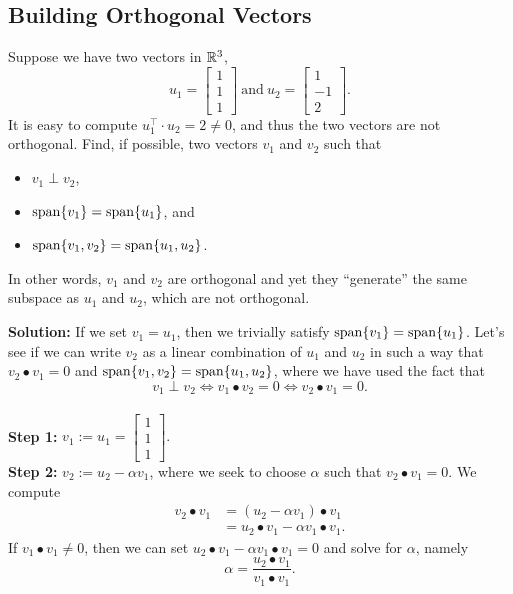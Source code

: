 \subsection{Building Orthogonal Vectors}
\begin{example}
\label{ex:Orthogonalize} Suppose we have two vectors in $\mathbb R^3$,
$$u_1 = \left[\begin{array}{c}  1 \\ 1 \\1\end{array} \right]~\text{and}~u_2 = \left[\begin{array}{r}  1 \\ -1 \\2\end{array} \right].$$
It is easy to compute $u_1^\top \cdot u_2 = 2 \neq 0$, and thus the two vectors are not orthogonal. Find, if possible, two vectors $v_1$ and $v_2$ such that 
\begin{itemize}
    \item $v_1 \perp v_2$, 
    \item $\mathrm{span} \{ v_1 \} = \mathrm{span} \{ u_1 \}$, and
    \item $\mathrm{span} \{ v_1, v_2 \} = \mathrm{span} \{ u_1, u_2 \}$.
\end{itemize}  
In other words, $v_1$ and $v_2$ are orthogonal and yet they ``generate'' the same subspace as $u_1$ and $u_2$, which are not orthogonal. 
 \end{example}

\textbf{Solution:} If we set $v_1 = u_1$, then we trivially satisfy $\mathrm{span} \{ v_1 \} = \mathrm{span} \{ u_1 \}$. Let's see if we can write $v_2$ as a linear combination of $u_1$ and $u_2$ in such a way that $v_2 \bullet v_1 =0$ and $\mathrm{span} \{ v_1, v_2 \} = \mathrm{span} \{ u_1, u_2 \}$, where we have used the fact that 
$$v_1 \perp v_2 \iff v_1 \bullet v_2 = 0 \iff v_2 \bullet v_1 = 0. $$\\

\textbf{Step 1:} $v_1 := u_1 = \left[\begin{array}{c}  1 \\ 1 \\1\end{array} \right].$ \\

\textbf{Step 2:} $v_2 := u_2  - \alpha v_1$, where we seek to choose $\alpha$ such that $v_2 \bullet v_1 = 0$. We compute
\begin{align*}
    v_2 \bullet v_1 &  = \left( u_2  - \alpha v_1 \right) \bullet  v_1 \\
    &= u_2 \bullet v_1 - \alpha v_1 \bullet v_1.
\end{align*}
If $ v_1 \bullet v_1\neq 0$, then we can set $u_2 \bullet v_1 - \alpha v_1 \bullet v_1 = 0$ and solve for $\alpha$, namely
$$\alpha = \frac{u_2 \bullet v_1}{v_1 \bullet v_1}. $$
\\



